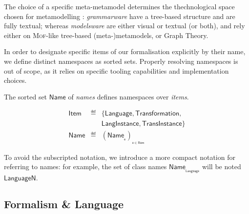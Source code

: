 The choice of a specific meta-metamodel determines the thechnological space 
chosen for metamodelling \cite{Wimmer-Kramler:2005}: \emph{grammarware} have a 
tree-based structure and are fully textual; whereas \emph{modelsware} are either 
visual or textual (or both), and rely either on \textsc{Mof}-like tree-based 
(meta-)metamodels, or Graph Theory. 



In order to designate specific items of our formalisation explicitly by their 
name, we define distinct namespaces as sorted sets. Properly resolving 
namespaces is out of scope, as it relies on specific tooling 
capabilities and implementation choices.

\begin{Definition}[Names]
   The sorted set $\mathsf{Name}$ of \emph{names} defines namespaces over 
\emph{items}.
   \begin{small}
   \begin{displaymath}
     \begin{array}{rcl}
		\mathsf{Item} & \eqdef & \{\mathsf{Language}, \mathsf{Transformation}, \\
                    &        & \mathsf{LangInstance}, \mathsf{TransInstance}\}\\
		\mathsf{Name}    & \eqdef & (\mathsf{Name}_{_{\mathsf{e}}})_{_{\mathsf{e} 
\in \mathsf{Item}}}
      \end{array}
\end{displaymath}
   \end{small}
\end{Definition}
To avoid the subscripted notation, we introduce a more compact notation for 
referring to names: for example, the set of class names 
$\mathsf{Name_{_{Language}}}$ will be noted $\mathsf{LanguageN}$.  

\subsection{Formalism \& Language}
\label{sec:Formalism-Language}


